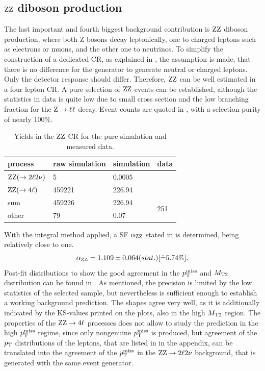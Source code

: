\subsection{$\mathrm{Z}\mathrm{Z}$ diboson production}
The last important and fourth biggest background contribution is $\mathrm{Z}\mathrm{Z}$ diboson production, where both Z bosons decay leptonically, one to charged leptons such as electrons or muons, and the other one to neutrinos. To simplify the construction of a dedicated CR, as explained in , the assumption is made, that there is no difference for the generator to generate neutral or charged leptons. Only the detector response should differ. Therefore, $\mathrm{Z}\mathrm{Z}$ can be well estimated in a four lepton CR. A pure selection of $\mathrm{Z}\mathrm{Z}$ events can be established, although the statistics in data is quite low due to small cross section and the low branching fraction for the $\mathrm{Z}\to\ell\ell$ decay. Event counts are quoted in , with a selection purity of nearly $100\%$.
\begin{table}[tbp]
 \centering
 \caption{Yields in the $\mathrm{Z}\mathrm{Z}$ CR for the pure simulation and measured data.}
 \label{tab:CRZZ}
 \begin{tabular}{llll}
  
  process                 & raw simulation & simulation & data                 \\\hline
  $\mathrm{Z}\mathrm{Z}(\to2\ell2\nu)$ & 5              & 0.0005     &                      \\
  $\mathrm{Z}\mathrm{Z}(\to4\ell)$      & 459221         & 226.94     &                      \\\hline\hline
  sum                     & 459226         & 226.94     & \multirow{2}{*}{251} \\
  other                   & 79             & 0.07       &                      
 \end{tabular}
\end{table}
With the integral method applied, a SF $\alpha_{\mathrm{Z}\mathrm{Z}}$ stated in  is determined, being relatively close to one.
\begin{equation}\label{eq:AlphaZZ}
 \alpha_{\mathrm{Z}\mathrm{Z}}=1.109 \pm 0.064 (stat.) [\hat{=}5.74\%].
\end{equation}
Post-fit distributions to show the good agreement in the $p_{\mathrm{T}}^\text{miss}$ and $M_{\mathrm{T2}}$ distribution can be found in . As mentioned, the precision is limited by the low statistics of the selected sample, but nevertheless is sufficient enough to establish a working background prediction. The shapes agree very well, as it is additionally indicated by the KS-values printed on the plots, also in the high $M_{\mathrm{T2}}$ region. The properties of the $\mathrm{Z}\mathrm{Z}\to4\ell$ processes does not allow to study the prediction in the high $p_{\mathrm{T}}^\text{miss}$ regime, since only nongenuine $p_{\mathrm{T}}^\text{miss}$ is produced, but agreement of the $p_{\mathrm{T}}$ distributions of the leptons, that are listed in  in the appendix, can be translated into the agreement of the $p_{\mathrm{T}}^\text{miss}$ in the $\mathrm{Z}\mathrm{Z}\to2\ell2\nu$ background, that is generated with the same event generator.
